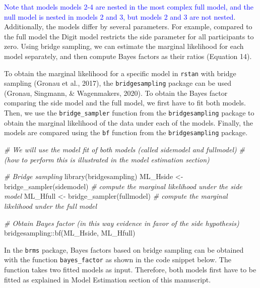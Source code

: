 \documentclass[
  english,
  doc,floatsintext]{apa6}
\newenvironment{Shaded}{\begin{snugshade}}{\end{snugshade}}
\newcommand{\CommentTok}[1]{\textcolor[rgb]{0.56,0.35,0.01}{\textit{#1}}}
\newcommand{\FunctionTok}[1]{\textcolor[rgb]{0.00,0.00,0.00}{#1}}
\newcommand{\NormalTok}[1]{#1}
\newcommand{\OtherTok}[1]{\textcolor[rgb]{0.56,0.35,0.01}{#1}}
\newcommand{\SpecialCharTok}[1]{\textcolor[rgb]{0.00,0.00,0.00}{#1}}
\begin{document}
\textcolor{blue}{Note that models models 2-4 are nested in the most complex full model, and the null model is nested in models 2 and 3, but models 2 and 3 are not nested}. Additionally, the models differ by several parameters. For example, compared to the full model the Digit model restricts the side parameter for all participants to zero. Using bridge sampling, we can estimate the marginal likelihood for each model separately, and then compute Bayes factors as their ratios (Equation 14).

To obtain the marginal likelihood for a specific model in \texttt{rstan} with bridge sampling (Gronau et al., 2017), the \texttt{bridgesampling} package can be used (Gronau, Singmann, \& Wagenmakers, 2020). To obtain the Bayes factor comparing the side model and the full model, we first have to fit both models. Then, we use the \texttt{bridge\_sampler} function from the \texttt{bridgesampling} package to obtain the marginal likelihood of the data under each of the models. Finally, the models are compared using the \texttt{bf} function from the \texttt{bridgesampling} package.
~

\scriptsize

\begin{Shaded}
\begin{Highlighting}[]
\CommentTok{\# We will use the model fit of both models (called sidemodel and fullmodel)}
\CommentTok{\# (how to perform this is illustrated in the model estimation section)}

\CommentTok{\# Bridge sampling }
\FunctionTok{library}\NormalTok{(bridgesampling)}
\NormalTok{ML\_Hside }\OtherTok{\textless{}{-}} \FunctionTok{bridge\_sampler}\NormalTok{(sidemodel)  }\CommentTok{\# compute the marginal likelihood under the side model }
\NormalTok{ML\_Hfull }\OtherTok{\textless{}{-}} \FunctionTok{bridge\_sampler}\NormalTok{(fullmodel)  }\CommentTok{\# compute the marginal likelihood under the full model }

\CommentTok{\# Obtain Bayes factor (in this way evidence in favor of the side hypothesis)}
\NormalTok{bridgesampling}\SpecialCharTok{::}\FunctionTok{bf}\NormalTok{(ML\_Hside, ML\_Hfull)}
\end{Highlighting}
\end{Shaded}

\normalsize

In the \texttt{brms} package, Bayes factors based on bridge sampling can be obtained with the function \texttt{bayes\_factor} as shown in the code snippet below. The function takes two fitted models as input. Therefore, both models first have to be fitted as explained in Model Estimation section of this manuscript.
\end{document}
